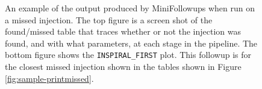 \begin{figure}[p]
\center
{}
\label{fig:sample-minifup_missedinj}
\caption{An example of the output produced by MiniFollowups when run on a missed injection. The top figure is a screen shot of the found/missed table that traces whether or not the injection was found, and with what parameters, at each stage in the pipeline. The bottom figure shows the \texttt{INSPIRAL\_FIRST} plot. This followup is for the closest missed injection shown in the tables shown in Figure \ref{fig:sample-printmissed}.}
\end{figure}

